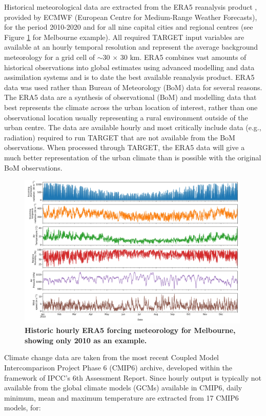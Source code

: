 \documentclass[utf8]{frontiersSCNS} %
\begin{document}
Historical meteorological data are extracted from the ERA5 reanalysis product \citep{Hersbach2020}, provided by ECMWF (European Centre for Medium-Range Weather Forecasts), for the period 2010-2020 and for all nine capital cities and regional centres (see Figure \ref{fig:mel_era5} for Melbourne example). All required TARGET input variables are available at an hourly temporal resolution and represent the average background meteorology for a grid cell of $\sim$30 $\times$ 30 km. ERA5 combines vast amounts of historical observations into global estimates using advanced modelling and data assimilation systems and is to date the best available reanalysis product. ERA5 data was used rather than Bureau of Meteorology (BoM) data for several reasons. The ERA5 data are a synthesis of observational (BoM) and modelling data that best represents the climate across the urban location of interest, rather than one observational location usually representing a rural environment outside of the urban centre. The data are available hourly and most critically include data (e.g., radiation) required to run TARGET that are not available from the BoM observations. When processed through TARGET, the ERA5 data will give a much better representation of the urban climate than is possible with the original BoM observations. 

\begin{figure}
\centering
\includegraphics[width=0.99\textwidth]{images/image1.jpg}
\caption{\bf Historic hourly ERA5 forcing meteorology for Melbourne, showing only 2010 as an example.}
 \label{fig:mel_era5}
\end{figure}

Climate change data are taken from the most recent Coupled Model Intercomparison Project Phase 6 \citep{Eyring2016} (CMIP6) archive, developed within the framework of IPCC's 6th Assessment Report\citep{IPCC2021}. Since hourly output is typically not available from the global climate models (GCMs) available in CMIP6, daily minimum, mean and maximum temperature are extracted from 17 CMIP6 models, for:
\end{document}
